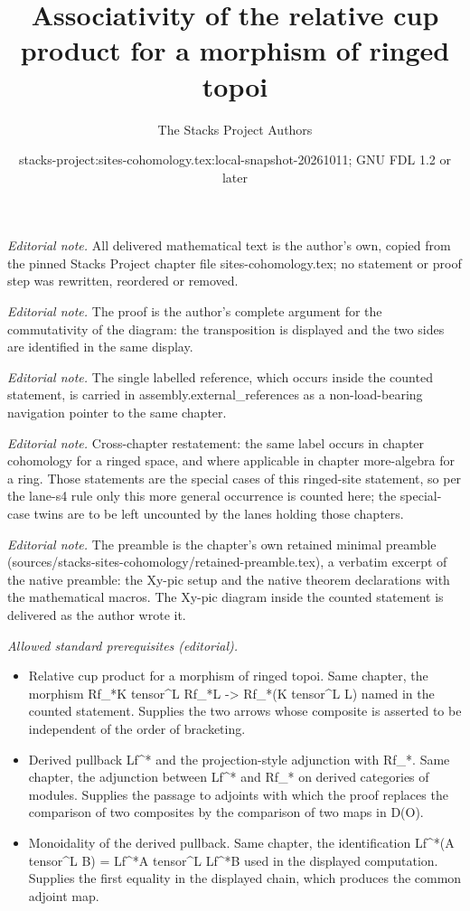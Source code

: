 \documentclass[10pt,a4paper]{amsart}
\title{Associativity of the relative cup product for a morphism of ringed topoi}
\author{The Stacks Project Authors}
\date{stacks-project:sites-cohomology.tex:local-snapshot-20261011; GNU FDL 1.2 or later}
\theoremstyle{plain}
\theoremstyle{definition}
\theoremstyle{remark}
\numberwithin{equation}{subsection}
\begin{document}
\maketitle
\noindent\textit{Editorial note.} All delivered mathematical text is the author's own, copied from the pinned Stacks Project chapter file sites-cohomology.tex; no statement or proof step was rewritten, reordered or removed.\par\medskip
\noindent\textit{Editorial note.} The proof is the author's complete argument for the commutativity of the diagram: the transposition is displayed and the two sides are identified in the same display.\par\medskip
\noindent\textit{Editorial note.} The single labelled reference, which occurs inside the counted statement, is carried in assembly.external\_references as a non-load-bearing navigation pointer to the same chapter.\par\medskip
\noindent\textit{Editorial note.} Cross-chapter restatement: the same label occurs in chapter cohomology for a ringed space, and where applicable in chapter more-algebra for a ring. Those statements are the special cases of this ringed-site statement, so per the lane-s4 rule only this more general occurrence is counted here; the special-case twins are to be left uncounted by the lanes holding those chapters.\par\medskip
\noindent\textit{Editorial note.} The preamble is the chapter's own retained minimal preamble (sources/stacks-sites-cohomology/retained-preamble.tex), a verbatim excerpt of the native preamble: the Xy-pic setup and the native theorem declarations with the mathematical macros. The Xy-pic diagram inside the counted statement is delivered as the author wrote it.\par\medskip
\noindent\textit{Allowed standard prerequisites (editorial).}\begin{itemize}
\item Relative cup product for a morphism of ringed topoi. Same chapter, the morphism Rf\_*K tensor\textasciicircum{}L Rf\_*L -> Rf\_*(K tensor\textasciicircum{}L L) named in the counted statement. Supplies the two arrows whose composite is asserted to be independent of the order of bracketing.
\item Derived pullback Lf\textasciicircum{}* and the projection-style adjunction with Rf\_*. Same chapter, the adjunction between Lf\textasciicircum{}* and Rf\_* on derived categories of modules. Supplies the passage to adjoints with which the proof replaces the comparison of two composites by the comparison of two maps in D(O).
\item Monoidality of the derived pullback. Same chapter, the identification Lf\textasciicircum{}*(A tensor\textasciicircum{}L B) = Lf\textasciicircum{}*A tensor\textasciicircum{}L Lf\textasciicircum{}*B used in the displayed computation. Supplies the first equality in the displayed chain, which produces the common adjoint map.
\end{itemize}\medskip
\end{document}

